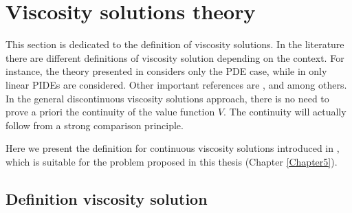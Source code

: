 \section{Viscosity solutions theory}


This section is dedicated to the definition of viscosity solutions.
In the literature there are different definitions of viscosity solution depending on the context. 
For instance, the theory presented in \cite{Pham} considers only the PDE case, while in \cite{Cont}
only linear PIDEs are considered. 
Other important references are \cite{FlemingSoner}, \cite{Ph98} and \cite{BaIm08} among others.
In the general discontinuous viscosity solutions approach, there is no
need to prove a priori the continuity of the value function $V$. The continuity will actually follow from
a strong comparison principle. 

\noindent
Here we present the definition for continuous viscosity solutions introduced in \cite{Kab16}, which is suitable for the problem proposed in this thesis (Chapter \ref{Chapter5}).





\subsection{Definition viscosity solution}


